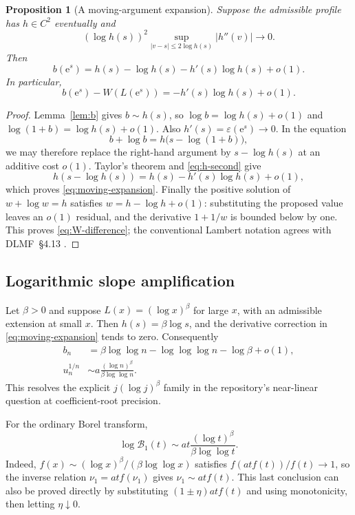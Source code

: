 \documentclass[11pt,a4paper]{article}
\numberwithin{equation}{section}
\newtheorem{proposition}[theorem]{Proposition}
\theoremstyle{definition}
\theoremstyle{remark}
\newcommand{\Bcal}{\mathcal B}
\newcommand{\eps}{\varepsilon}
\newcommand{\ee}{\mathrm e}
\begin{document}
\begin{proposition}[A moving-argument expansion]
\label{prop:moving}
Suppose the admissible profile has $h\in C^2$ eventually and
\begin{equation}
 (\log h(s))^2
 \sup_{|v-s|\le2\log h(s)}|h''(v)|\longrightarrow0.
 \label{eq:h-second}
\end{equation}
Then
\begin{equation}
 b(\ee^s)=h(s)-\log h(s)-h'(s)\log h(s)+o(1).
 \label{eq:moving-expansion}
\end{equation}
In particular,
\begin{equation}
 b(\ee^s)-W(L(\ee^s))=-h'(s)\log h(s)+o(1).
 \label{eq:W-difference}
\end{equation}
\end{proposition}
\begin{proof}
Lemma~\ref{lem:b} gives $b\sim h(s)$, so
$\log b=\log h(s)+o(1)$ and
$\log(1+b)=\log h(s)+o(1)$. Also $h'(s)=\eps(\ee^s)\to0$.
In the equation
\[
 b+\log b=h\bigl(s-\log(1+b)\bigr),
\]
we may therefore replace the right-hand argument by $s-\log h(s)$ at
an additive cost $o(1)$. Taylor's theorem and \eqref{eq:h-second} give
\[
 h(s-\log h(s))=h(s)-h'(s)\log h(s)+o(1),
\]
which proves \eqref{eq:moving-expansion}. Finally the positive solution
of $w+\log w=h$ satisfies $w=h-\log h+o(1)$: substituting the proposed
value leaves an $o(1)$ residual, and the derivative $1+1/w$ is bounded
below by one. This proves \eqref{eq:W-difference}; the conventional
Lambert notation agrees with DLMF~\S4.13 \cite{dlmf}.
\end{proof}

\subsection{Logarithmic slope amplification}
Let $\beta>0$ and suppose $L(x)=(\log x)^\beta$ for large $x$,
with an admissible extension at small $x$. Then $h(s)=\beta\log s$,
and the derivative correction in \eqref{eq:moving-expansion} tends to
zero. Consequently
\begin{align}
 b_n&=\beta\log\log n-\log\log\log n-\log\beta+o(1),\\
 u_n^{1/n}&\sim
 a\frac{(\log n)^\beta}{\beta\log\log n}.
 \label{eq:log-power-root}
\end{align}
This resolves the explicit $j(\log j)^\beta$ family in the repository's
near-linear question at coefficient-root precision.

For the ordinary Borel transform,
\begin{equation}
 \log\Bcal_1(t)\sim
 a t\frac{(\log t)^\beta}{\beta\log\log t}.
 \label{eq:log-power-borel}
\end{equation}
Indeed, $f(x)\sim(\log x)^\beta/(\beta\log\log x)$ satisfies
$f(atf(t))/f(t)\to1$, so the inverse relation
$\nu_1=atf(\nu_1)$ gives $\nu_1\sim atf(t)$. This last conclusion can
also be proved directly by substituting $(1\pm\eta)atf(t)$ and using
monotonicity, then letting $\eta\downarrow0$.
\end{document}

